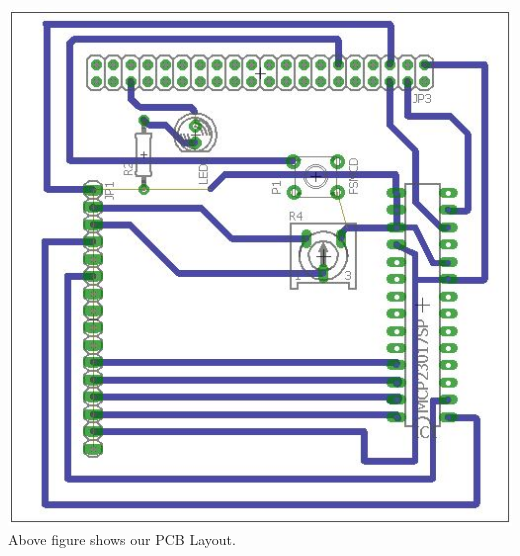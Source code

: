 \documentclass[a4paper,12pt,oneside]{book}
\begin{document}
\includegraphics[scale= 0.3]{lcd_pcb_layout}
\flushleft
Above figure shows our PCB Layout.
\end{document}
